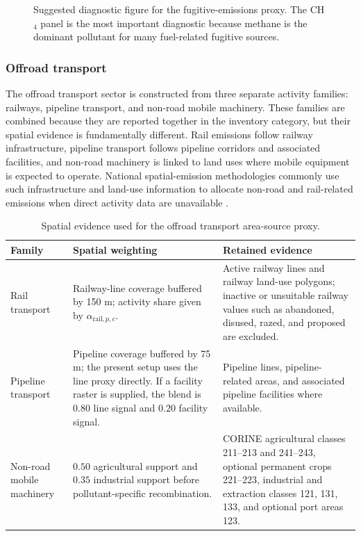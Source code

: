 \begin{figure}[htbp]
  \centering
  \caption{Suggested diagnostic figure for the fugitive-emissions proxy.
  The CH$_4$ panel is the most important diagnostic because methane is the
  dominant pollutant for many fuel-related fugitive sources.}
  \label{fig:fugitive-combined-proxy-placeholder}
\end{figure}

\subsubsection{Offroad transport}
\label{sec:combined-offroad}

The offroad transport sector is constructed from three separate activity
families: railways, pipeline transport, and non-road mobile machinery.
These families are combined because they are reported together in the
inventory category, but their spatial evidence is fundamentally
different. Rail emissions follow railway infrastructure, pipeline
transport follows pipeline corridors and associated facilities, and
non-road machinery is linked to land uses where mobile equipment is
expected to operate. National spatial-emission methodologies commonly use
such infrastructure and land-use information to allocate non-road and
rail-related emissions when direct activity data are unavailable
\citep{NAEI2024Spatial}.

\begin{table}[htbp]
  \centering
  \caption{Spatial evidence used for the offroad transport area-source proxy.}
  \label{tab:offroad-spatial-rules}
  \scriptsize
  \begin{tabular}{p{} p{} p{}}
    \toprule
    Family & Spatial weighting & Retained evidence \\
    \midrule
    Rail transport &
    Railway-line coverage buffered by 150 m; activity share given by $\alpha_{\mathrm{rail},p,c}$. &
    Active railway lines and railway land-use polygons; inactive or unsuitable railway values such as abandoned, disused, razed, and proposed are excluded. \\
    Pipeline transport &
    Pipeline coverage buffered by 75 m; the present setup uses the line proxy directly. If a facility raster is supplied, the blend is $0.80$ line signal and $0.20$ facility signal. &
    Pipeline lines, pipeline-related areas, and associated pipeline facilities where available. \\
    Non-road mobile machinery &
    $0.50$ agricultural support and $0.35$ industrial support before pollutant-specific recombination. &
    CORINE agricultural classes 211--213 and 241--243, optional permanent crops 221--223, industrial and extraction classes 121, 131, 133, and optional port areas 123. \\
    \bottomrule
  \end{tabular}
\end{table}

